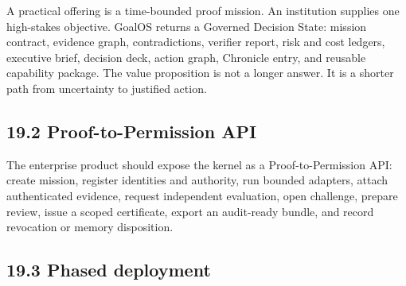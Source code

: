 A practical offering is a time-bounded proof mission. An institution
supplies one high-stakes objective. GoalOS returns a Governed Decision
State: mission contract, evidence graph, contradictions, verifier
report, risk and cost ledgers, executive brief, decision deck, action
graph, Chronicle entry, and reusable capability package. The value
proposition is not a longer answer. It is a shorter path from
uncertainty to justified action.

\subsection{19.2 Proof-to-Permission API}\label{proof-to-permission-api}

The enterprise product should expose the kernel as a Proof-to-Permission
API: create mission, register identities and authority, run bounded
adapters, attach authenticated evidence, request independent evaluation,
open challenge, prepare review, issue a scoped certificate, export an
audit-ready bundle, and record revocation or memory disposition.

\subsection{19.3 Phased deployment}\label{phased-deployment}


